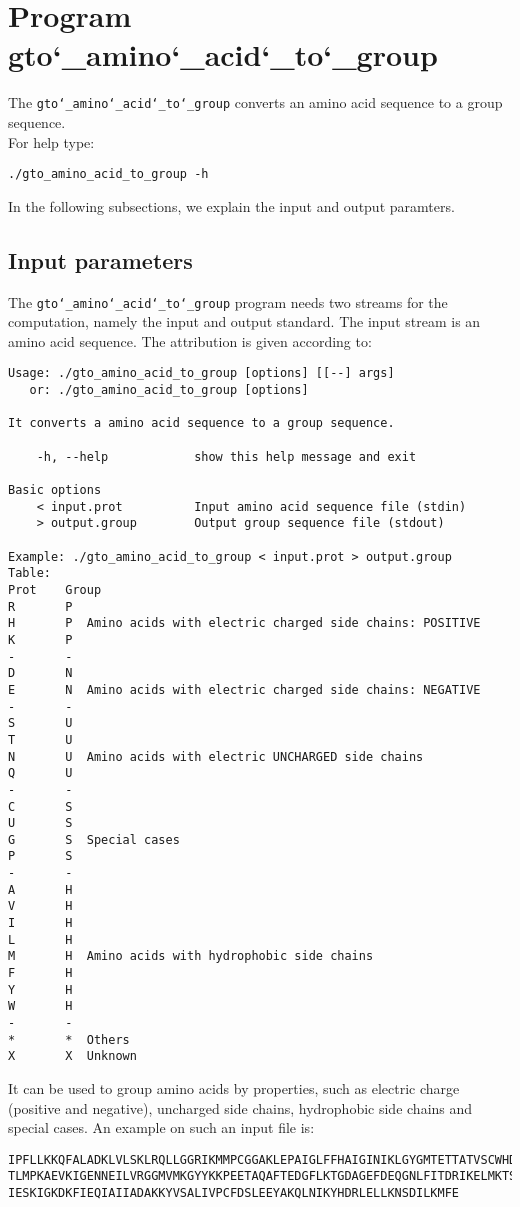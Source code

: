 \section{Program gto\char`_amino\char`_acid\char`_to\char`_group}

The \texttt{gto\char`_amino\char`_acid\char`_to\char`_group} converts an amino acid sequence to a group 
sequence.\\
For help type:
\begin{lstlisting}
./gto_amino_acid_to_group -h
\end{lstlisting}
In the following subsections, we explain the input and output paramters.

\subsection*{Input parameters}

The \texttt{gto\char`_amino\char`_acid\char`_to\char`_group} program needs two streams for the computation, namely the input and output standard. The input stream is an amino acid sequence.
The attribution is given according to:
\begin{lstlisting}
Usage: ./gto_amino_acid_to_group [options] [[--] args]
   or: ./gto_amino_acid_to_group [options]

It converts a amino acid sequence to a group sequence.

    -h, --help            show this help message and exit

Basic options
    < input.prot          Input amino acid sequence file (stdin)
    > output.group        Output group sequence file (stdout)

Example: ./gto_amino_acid_to_group < input.prot > output.group
Table:
Prot	Group
R		P
H		P  Amino acids with electric charged side chains: POSITIVE
K		P
-		-
D		N
E		N  Amino acids with electric charged side chains: NEGATIVE
-		-
S		U
T		U
N		U  Amino acids with electric UNCHARGED side chains
Q		U
-		-
C		S
U		S
G		S  Special cases
P		S
-		-
A		H
V		H
I		H
L		H
M		H  Amino acids with hydrophobic side chains
F		H
Y		H
W		H
-		-
*		*  Others
X		X  Unknown
\end{lstlisting}
It can be used to group amino acids by properties, such as electric charge (positive
and negative), uncharged side chains, hydrophobic side chains and special cases.
An example on such an input file is:
\begin{lstlisting}
IPFLLKKQFALADKLVLSKLRQLLGGRIKMMPCGGAKLEPAIGLFFHAIGINIKLGYGMTETTATVSCWHDFQFNPNSIG
TLMPKAEVKIGENNEILVRGGMVMKGYYKKPEETAQAFTEDGFLKTGDAGEFDEQGNLFITDRIKELMKTSNGKYIAPQY
IESKIGKDKFIEQIAIIADAKKYVSALIVPCFDSLEEYAKQLNIKYHDRLELLKNSDILKMFE
\end{lstlisting}

